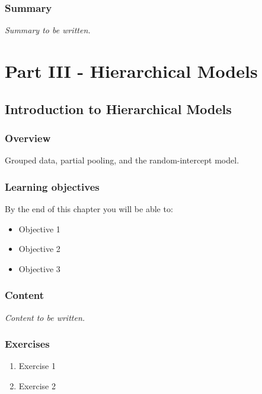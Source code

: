 \documentclass[
  11pt,
  a4paper,
  oneside,
  openany]{scrbook}
\providecommand{\tightlist}{%
  \setlength{\itemsep}{0pt}\setlength{\parskip}{0pt}}\usepackage{longtable,booktabs,array}
\begin{document}
\section{Summary}\label{summary-6}

\emph{Summary to be written.}

\part{Part III - Hierarchical Models}

\chapter{Introduction to Hierarchical
Models}\label{introduction-to-hierarchical-models}

\section{Overview}\label{overview-7}

Grouped data, partial pooling, and the random-intercept model.

\section{Learning objectives}\label{learning-objectives-7}

By the end of this chapter you will be able to:

\begin{itemize}
\tightlist
\item[$\square$]
  Objective 1
\item[$\square$]
  Objective 2
\item[$\square$]
  Objective 3
\end{itemize}

\section{Content}\label{content-6}

\emph{Content to be written.}

\section{Exercises}\label{exercises-7}

\begin{enumerate}
\def\labelenumi{\arabic{enumi}.}
\tightlist
\item
  Exercise 1
\item
  Exercise 2
\end{enumerate}
\end{document}
